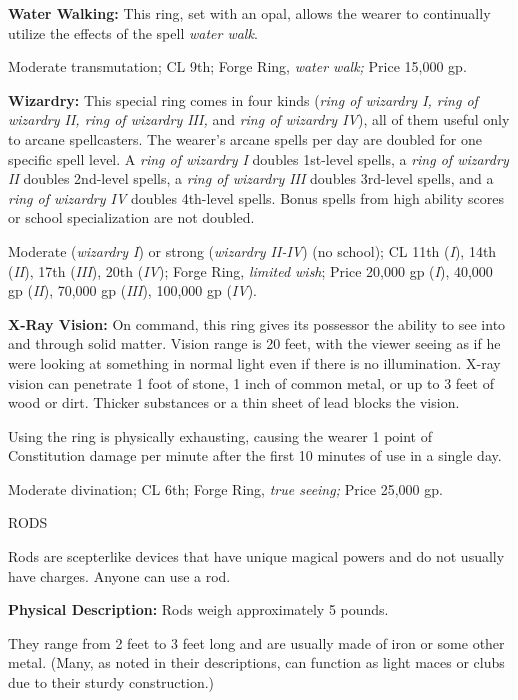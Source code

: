 \documentclass{article}
\begin{document}
\textbf{Water Walking: }This ring, set with an opal, allows the wearer to continually 
utilize the effects of the spell \textit{water walk}.

Moderate transmutation; CL 9th; Forge Ring, \textit{water walk; }Price 15,000 gp.

\textbf{Wizardry:} This special ring comes in four kinds (\textit{ring of wizardry 
I, ring of wizardry II, ring of wizardry III, }and \textit{ring of wizardry IV}), 
all of them useful only to arcane spellcasters. The wearer's arcane spells per 
day are doubled for one specific spell level. A \textit{ring of wizardry I }doubles 
1st-level spells, a \textit{ring of wizardry II }doubles 2nd-level spells, a \textit{ring 
of wizardry III }doubles 3rd-level spells, and a \textit{ring of wizardry IV }doubles 
4th-level spells. Bonus spells from high ability scores or school specialization 
are not doubled.

Moderate (\textit{wizardry I}) or strong (\textit{wizardry II-IV}) (no school); 
CL 11th (\textit{I}), 14th (\textit{II}), 17th (\textit{III}), 20th (\textit{IV}); 
Forge Ring, \textit{limited wish}; Price 20,000 gp (\textit{I}), 40,000 gp (\textit{II}), 
70,000 gp (\textit{III}), 100,000 gp (\textit{IV}).

\textbf{X-Ray Vision:} On command, this ring gives its possessor the ability to 
see into and through solid matter. Vision range is 20 feet, with the viewer seeing 
as if he were looking at something in normal light even if there is no illumination. 
X-ray vision can penetrate 1 foot of stone, 1 inch of common metal, or up to 3 
feet of wood or dirt. Thicker substances or a thin sheet of lead blocks the vision.

Using the ring is physically exhausting, causing the wearer 1 point of Constitution 
damage per minute after the first 10 minutes of use in a single day.

Moderate divination; CL 6th; Forge Ring, \textit{true seeing; }Price 25,000 gp.

\vspace{12pt}
RODS

Rods are scepterlike devices that have unique magical powers and do not usually 
have charges. Anyone can use a rod.

\textbf{Physical Description:} Rods weigh approximately 5 pounds.

They range from 2 feet to 3 feet long and are usually made of iron or some other 
metal. (Many, as noted in their descriptions, can function as light maces or clubs 
due to their sturdy construction.)
\end{document}
